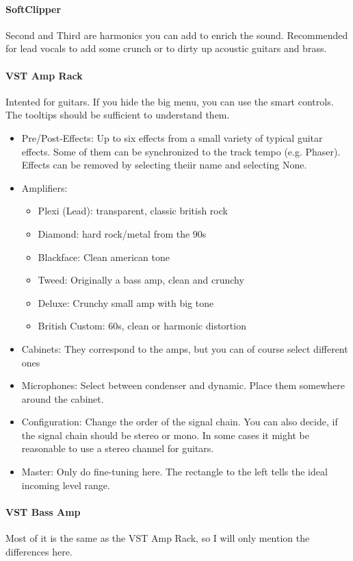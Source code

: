 \documentclass[10pt]{article}
\begin{document}
\paragraph{SoftClipper} Second and Third are harmonics you can add to enrich the sound. Recommended for lead vocals to add some crunch or to dirty up acoustic guitars and brass.

\paragraph{VST Amp Rack} Intented for guitars. If you hide the big menu, you can use the smart controls. The tooltips should be sufficient to understand them.

\begin{itemize}
	\item Pre/Post-Effects: Up to six effects from a small variety of typical guitar effects. Some of them can be synchronized to the track tempo (e.g. Phaser). Effects can be removed by selecting theiir name and selecting None.
	\item Amplifiers:
	\begin{itemize}
		\item Plexi (Lead): transparent, classic british rock
		\item Diamond: hard rock/metal from the 90s
		\item Blackface: Clean american tone
		\item Tweed: Originally a bass amp, clean and crunchy
		\item Deluxe: Crunchy small amp with big tone
		\item British Custom: 60s, clean or harmonic distortion
	\end{itemize}
	\item Cabinets: They correspond to the amps, but you can of course select different ones
	\item Microphones: Select between condenser and dynamic. Place them somewhere around the cabinet.
	\item Configuration: Change the order of the signal chain. You can also decide, if the signal chain should be stereo or mono. In some cases it might be reasonable to use a stereo channel for guitars.
	\item Master: Only do fine-tuning here. The rectangle to the left tells the ideal incoming level range.
\end{itemize}

\paragraph{VST Bass Amp} Most of it is the same as the VST Amp Rack, so I will only mention the differences here.
\end{document}
